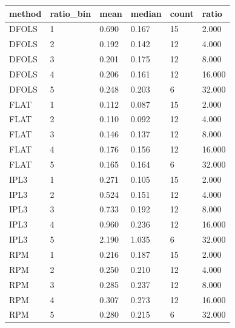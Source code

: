 \begin{tabular}{llllll}
\hline
method & ratio\_bin & mean & median & count & ratio \\
\hline
DFOLS & 1 & 0.690 & 0.167 & 15 & 2.000 \\
DFOLS & 2 & 0.192 & 0.142 & 12 & 4.000 \\
DFOLS & 3 & 0.201 & 0.175 & 12 & 8.000 \\
DFOLS & 4 & 0.206 & 0.161 & 12 & 16.000 \\
DFOLS & 5 & 0.248 & 0.203 & 6 & 32.000 \\
FLAT & 1 & 0.112 & 0.087 & 15 & 2.000 \\
FLAT & 2 & 0.110 & 0.092 & 12 & 4.000 \\
FLAT & 3 & 0.146 & 0.137 & 12 & 8.000 \\
FLAT & 4 & 0.176 & 0.156 & 12 & 16.000 \\
FLAT & 5 & 0.165 & 0.164 & 6 & 32.000 \\
IPL3 & 1 & 0.271 & 0.105 & 15 & 2.000 \\
IPL3 & 2 & 0.524 & 0.151 & 12 & 4.000 \\
IPL3 & 3 & 0.733 & 0.192 & 12 & 8.000 \\
IPL3 & 4 & 0.960 & 0.236 & 12 & 16.000 \\
IPL3 & 5 & 2.190 & 1.035 & 6 & 32.000 \\
RPM & 1 & 0.216 & 0.187 & 15 & 2.000 \\
RPM & 2 & 0.250 & 0.210 & 12 & 4.000 \\
RPM & 3 & 0.285 & 0.237 & 12 & 8.000 \\
RPM & 4 & 0.307 & 0.273 & 12 & 16.000 \\
RPM & 5 & 0.280 & 0.215 & 6 & 32.000 \\
\hline
\end{tabular}
